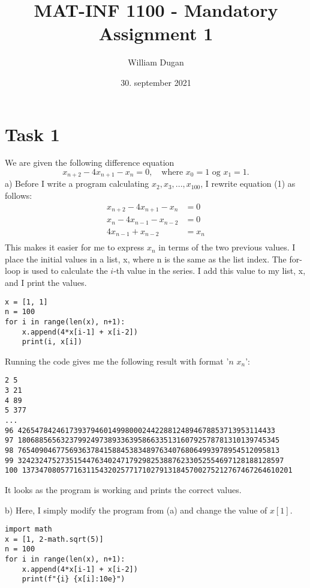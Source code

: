 \documentclass[11pt,
				a4paper,
				article,
				oneside,
				oldfontcommands]{memoir}
\title{MAT-INF 1100 - Mandatory Assignment 1}
\author{William Dugan}
\date{30. september 2021}
\begin{document}
\maketitle
\thispagestyle{empty}

\pagebreak
\setcounter{page}{1}

\section{Task 1}
We are given the following difference equation
\begin{equation}\label{eq:diff}
	x_{n+2} - 4 x_{n+1} - x_{n} = 0,  \quad\text{where  $x_0 = 1$ og $x_1 = 1$.}
\end{equation}
a) Before I write a program calculating $x_2, x_3, ..., x_{100}$, I rewrite equation (1) as follows:
\begin{align*}
	x_{n+2} - 4 x_{n+1} - x_{n} &= 0 \\
	x_{n} - 4 x_{n-1} - x_{n-2} &= 0 \\
	4 x_{n-1} + x_{n-2} &= x_{n} \\
\end{align*}
This makes it easier for me to express $x_n$ in terms of the two previous values. I place the initial values in a list, x, where n is the same as the list index. The for-loop is used to calculate the $i$-th value in the series. I add this value to my list, x, and I print the values.
\begin{lstlisting}
x = [1, 1]
n = 100
for i in range(len(x), n+1):
	x.append(4*x[i-1] + x[i-2])
	print(i, x[i])
\end{lstlisting}
Running the code gives me the following result with format '$n$ $x_n$':

\begin{lstlisting}[numbers=none]
2 5
3 21
4 89
5 377
...
96 426547842461739379460149980002442288124894678853713953114433
97 1806885656323799249738933639586633513160792578781310139745345
98 7654090467756936378415884538348976340768064993978954512095813
99 32423247527351544763402471792982538876233052554697128188128597
100 137347080577163115432025771710279131845700275212767467264610201
\end{lstlisting}
It looks as the program is working and prints the correct values.

\pagebreak

b) Here, I simply modify the program from (a) and change the value of $x[1]$.
\begin{lstlisting}
import math
x = [1, 2-math.sqrt(5)]
n = 100
for i in range(len(x), n+1):
	x.append(4*x[i-1] + x[i-2])
	print(f"{i} {x[i]:10e}")
\end{lstlisting}
\end{document}
